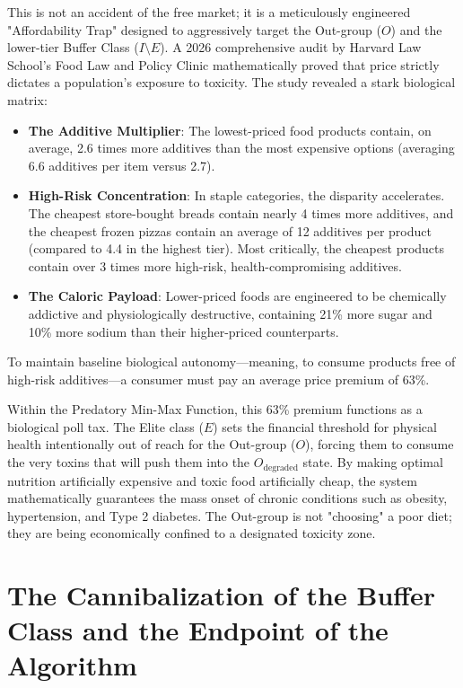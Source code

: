 \documentclass[12pt,openany]{book}
\begin{document}
This is not an accident of the free market; it is a meticulously engineered "Affordability Trap" designed to aggressively target the Out-group ($O$) and the lower-tier Buffer Class ($I \setminus E$). A 2026 comprehensive audit by Harvard Law School’s Food Law and Policy Clinic mathematically proved that price strictly dictates a population's exposure to toxicity.
The study revealed a stark biological matrix:
\begin{itemize}
    \item \textbf{The Additive Multiplier}: The lowest-priced food products contain, on average, 2.6 times more additives than the most expensive options (averaging 6.6 additives per item versus 2.7).
    \item \textbf{High-Risk Concentration}: In staple categories, the disparity accelerates. The cheapest store-bought breads contain nearly 4 times more additives, and the cheapest frozen pizzas contain an average of 12 additives per product (compared to 4.4 in the highest tier). Most critically, the cheapest products contain over 3 times more high-risk, health-compromising additives.
    \item \textbf{The Caloric Payload}: Lower-priced foods are engineered to be chemically addictive and physiologically destructive, containing 21\% more sugar and 10\% more sodium than their higher-priced counterparts.
\end{itemize}
To maintain baseline biological autonomy—meaning, to consume products free of high-risk additives—a consumer must pay an average price premium of 63\%.

Within the Predatory Min-Max Function, this 63\% premium functions as a biological poll tax. The Elite class ($E$) sets the financial threshold for physical health intentionally out of reach for the Out-group ($O$), forcing them to consume the very toxins that will push them into the $O_{\text{degraded}}$ state. By making optimal nutrition artificially expensive and toxic food artificially cheap, the system mathematically guarantees the mass onset of chronic conditions such as obesity, hypertension, and Type 2 diabetes. The Out-group is not "choosing" a poor diet; they are being economically confined to a designated toxicity zone.

\section{The Cannibalization of the Buffer Class and the Endpoint of the Algorithm}
\end{document}
